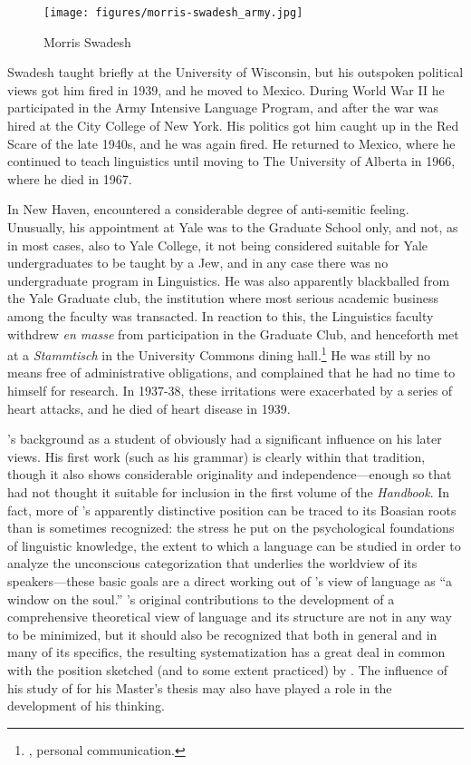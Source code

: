 \begin{wrapfigure}{r}{.35\textwidth}
  \texttt{[image: figures/morris-swadesh\_army.jpg]}
  \caption{Morris Swadesh}
  \label{fig:ch.sapir.swadesh_army}
\end{wrapfigure}
Swadesh taught briefly at the University of Wisconsin, but his
outspoken political views got him fired in 1939, and he moved to
Mexico.  During World War II he participated in the Army Intensive
Language Program, and after the war was hired at the City College of
New York. His politics got him caught up in the Red Scare of the late
1940s, and he was again fired. He returned to Mexico, where he
continued to teach linguistics until moving to The University of
Alberta in 1966, where he died in 1967.

In New Haven, {\Sapir} encountered a considerable degree of anti-semitic
feeling. Unusually, his appointment at Yale was to the Graduate School
only, and not, as in most cases, also to Yale College, it not being
considered suitable for Yale undergraduates to be taught by a Jew, and
in any case there was no undergraduate program in Linguistics. He was
also apparently blackballed from the Yale Graduate club, the
institution where most serious academic business among the faculty was
transacted. In reaction to this, the Linguistics faculty withdrew
\emph{en masse} from participation in the Graduate Club, and
henceforth met at a \emph{Stammtisch} in the University Commons dining
hall.\footnote{, personal communication.}  He was still
by no means free of administrative obligations, and complained that he
had no time to himself for research. In 1937-38, these irritations
were exacerbated by a series of heart attacks, and he died of heart
disease in 1939.

{\Sapir}'s background as a student of {\Boas} obviously had a significant
influence on his later views. His first work (such as his 
grammar) is clearly within that tradition, though it also shows
considerable originality and independence---enough so that {\Boas} had
not thought it suitable for inclusion in the first volume of the
\textsl{Handbook}. In fact, more of {\Sapir}'s apparently distinctive
position can be traced to its Boasian roots than is sometimes
recognized: the {stress} he put on the psychological foundations of
linguistic knowledge, the extent to which a language can be studied in
order to analyze the unconscious categorization that underlies the
worldview of its speakers—these basic goals are a direct working out
of {\Boas}'s view of language as ``a window on the soul.''  {\Sapir}'s
original contributions to the development of a comprehensive
theoretical view of language and its structure are not in any way to
be minimized, but it should also be recognized that both in general
and in many of its specifics, the resulting systematization has a
great deal in common with the position sketched (and to some extent
practiced) by {\Boas}. The influence of his study of  for
his Master's thesis may also have played a role in the development of
his thinking.


